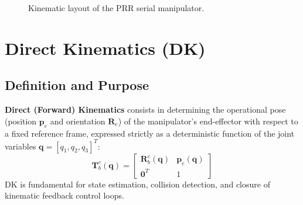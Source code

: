 \documentclass[11pt, a4paper]{article}
\begin{document}
\begin{figure}[htbp]
\caption{Kinematic layout of the PRR serial manipulator.}
\label{fig:prr_schematic}
\end{figure}

\section{Direct Kinematics (DK)}
\subsection{Definition and Purpose}
\textbf{Direct (Forward) Kinematics} consists in determining the operational pose (position $\mathbf{p}_e$ and orientation $\mathbf{R}_e$) of the manipulator's end-effector with respect to a fixed reference frame, expressed strictly as a deterministic function of the joint variables $\mathbf{q} = [q_1, q_2, q_3]^T$:
\begin{equation}
    \mathbf{T}_b^e(\mathbf{q}) = 
    \begin{bmatrix}
        \mathbf{R}_b^e(\mathbf{q}) & \mathbf{p}_e(\mathbf{q}) \\
        \mathbf{0}^T & 1
    \end{bmatrix}
\end{equation}
DK is fundamental for state estimation, collision detection, and closure of kinematic feedback control loops.
\end{document}

